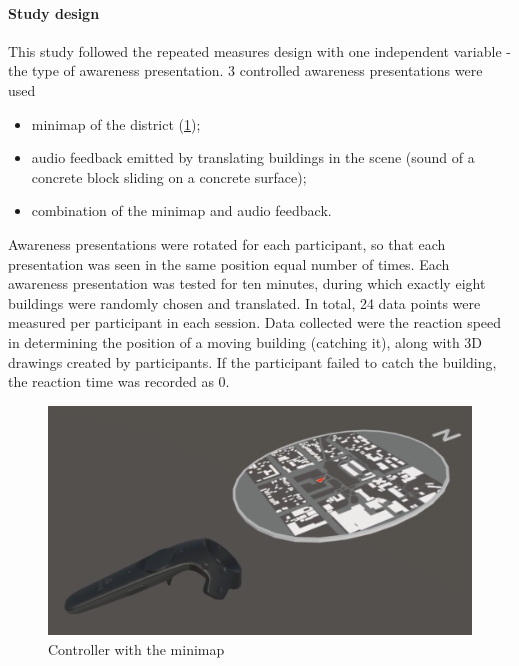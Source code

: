 
\paragraph{Study design}
This study followed the repeated measures design with one independent variable - the type of awareness presentation. 3 controlled awareness presentations were used
\begin{itemize}
	\item minimap of the district (\ref{fig:minimap_controller});
	\item audio feedback emitted by translating buildings in the scene (sound of a concrete block sliding on a concrete surface);
	\item combination of the minimap and audio feedback.
\end{itemize}

Awareness presentations were rotated for each participant, so that each presentation was seen in the same position equal number of times. 
Each awareness presentation was tested for ten minutes, during which exactly eight buildings were randomly chosen and translated. In total, 24 data points were measured per participant in each session. Data collected were the reaction speed in determining the position of a moving building (catching it), along with 3D drawings created by participants. If the participant failed to catch the building, the reaction time was recorded as 0.

\begin{figure}[h]
	\centering
	\includegraphics[width=0.7\linewidth]{figures/minimap_controller}
	\caption{Controller with the minimap}
	\label{fig:minimap_controller}
\end{figure}

